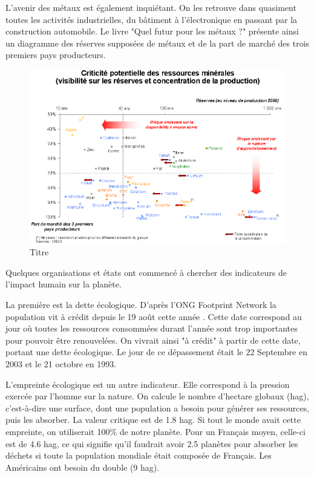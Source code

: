 L'avenir des métaux est également inquiétant. On les retrouve dans quasiment toutes les activités industrielles, du bâtiment à l’électronique en passant par la construction automobile. Le livre "Quel futur pour les métaux ?" \cite{LivreFuturMetaux} présente ainsi un diagramme des réserves supposées de métaux et de la part de marché des trois premiers pays producteurs.

\begin{figure}[h]
\includegraphics[scale=0.75]{Rsc/risquemetaux.png}
\caption{Titre}
\label{indentifiantUnique}%
\end{figure}

\medbreak Quelques organisations et états ont commencé à chercher des indicateurs de l'impact humain sur la planète.

La première est la dette écologique. D'après l'ONG Footprint Network la population vit à crédit depuis le 19 août cette année \cite{DateACredit}. Cette date correspond au jour où toutes les ressources consommées durant l'année sont trop importantes pour pouvoir être renouvelées. On vivrait ainsi "à crédit" à partir de cette date, portant une dette écologique. Le jour de ce dépassement était le 22 Septembre en 2003 et le 21 octobre en 1993.

L'empreinte écologique est un autre indicateur. Elle correspond à la pression exercée par l'homme sur la nature. On calcule le nombre d'hectare globaux (hag), c'est-à-dire une surface, dont une population a besoin pour générer ses ressources, puis les absorber. La valeur critique est de 1.8 hag. Si tout le monde avait cette empreinte, on utiliserait 100\% de notre planète. Pour un Français moyen, celle-ci est de 4.6 hag, ce qui signifie qu'il faudrait avoir 2.5 planètes pour absorber les déchets si toute la population mondiale était composée de Français. Les Américains ont besoin du double (9 hag).

